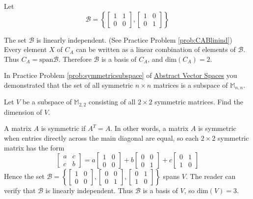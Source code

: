 \documentclass{ximera}
\begin{document}
\begin{example}
\begin{explanation}
Let 
$$\mathcal{B}=\left\{\begin{bmatrix}1&1\\0&0\end{bmatrix},\begin{bmatrix}1&0\\0&1\end{bmatrix}\right\}$$

The set $\mathcal{B}$ is linearly independent. (See Practice Problem \ref{prob:CABlinind}) Every element $X$ of $C_A$ can be written as a linear combination of elements of $\mathcal{B}$.  Thus $C_A=\mbox{span}\mathcal{B}$.
 Therefore $\mathcal{B}$ is a basis of $C_A$, and $\mbox{dim}(C_A) = 2$.
\end{explanation}
\end{example}

\begin{example}\label{ex:symmetricmatsubspace} 
In Practice Problem \ref{prob:symmetricsubspace} of \href{https://ximera.osu.edu/oerlinalg/LinearAlgebra/VSP-0050/main}{Abstract Vector Spaces} you demonstrated that the set of all symmetric $n\times n$ matrices is a subspace of $\mathbb{M}_{n,n}$.

Let $V$ be a subspace of $\mathbb{M}_{2,2}$ consisting of all $2\times 2$ symmetric matrices.  Find the dimension of $V$.

\begin{explanation}
A matrix $A$ is symmetric if $A^{T} = A$. In other words, a matrix $A$ is symmetric when entries directly across the main diagonal are equal, so each $2 \times 2$ symmetric matrix has the form
$$
\begin{bmatrix}
a & c \\
c & b
\end{bmatrix}
= a\begin{bmatrix}
1 & 0 \\
0 & 0
\end{bmatrix}
+ b\begin{bmatrix}
0 & 0 \\
0 & 1
\end{bmatrix}
+ c\begin{bmatrix}
0 & 1 \\
1 & 0
\end{bmatrix}
$$
Hence the set 
$\mathcal{B} = \left\{
\begin{bmatrix}
1 & 0 \\
0 & 0
\end{bmatrix}, \begin{bmatrix}
0 & 0 \\
0 & 1
\end{bmatrix}, \begin{bmatrix}
0 & 1 \\
1 & 0
\end{bmatrix}
\right\}$
 spans $V$. The reader can verify that $\mathcal{B}$ is linearly independent. Thus $\mathcal{B}$ is a basis of $V$, so $\mbox{dim}(V) = 3$.
\end{explanation}
\end{example}
\end{document}
